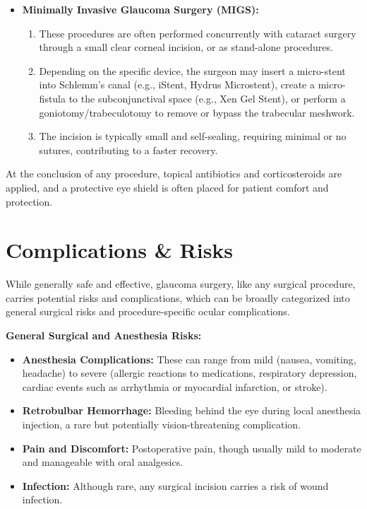 \begin{itemize}
\begin{enumerate}
      \item The conjunctiva is meticulously closed over the plate and tube, ensuring a smooth, watertight surface.
    \end{enumerate}
  \item \textbf{Minimally Invasive Glaucoma Surgery (MIGS):}
    \begin{enumerate}
      \item These procedures are often performed concurrently with cataract surgery through a small clear corneal incision, or as stand-alone procedures.
      \item Depending on the specific device, the surgeon may insert a micro-stent into Schlemm's canal (e.g., iStent, Hydrus Microstent), create a micro-fistula to the subconjunctival space (e.g., Xen Gel Stent), or perform a goniotomy/trabeculotomy to remove or bypass the trabecular meshwork.
      \item The incision is typically small and self-sealing, requiring minimal or no sutures, contributing to a faster recovery.
    \end{enumerate}
\end{itemize}
At the conclusion of any procedure, topical antibiotics and corticosteroids are applied, and a protective eye shield is often placed for patient comfort and protection.

\section*{Complications \& Risks}
While generally safe and effective, glaucoma surgery, like any surgical procedure, carries potential risks and complications, which can be broadly categorized into general surgical risks and procedure-specific ocular complications.

\textbf{General Surgical and Anesthesia Risks:}
\begin{itemize}
  \item \textbf{Anesthesia Complications:} These can range from mild (nausea, vomiting, headache) to severe (allergic reactions to medications, respiratory depression, cardiac events such as arrhythmia or myocardial infarction, or stroke).
  \item \textbf{Retrobulbar Hemorrhage:} Bleeding behind the eye during local anesthesia injection, a rare but potentially vision-threatening complication.
  \item \textbf{Pain and Discomfort:} Postoperative pain, though usually mild to moderate and manageable with oral analgesics.
  \item \textbf{Infection:} Although rare, any surgical incision carries a risk of wound infection.
\end{itemize}

